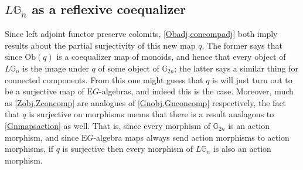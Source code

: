\subsection{$L\mathbb{G}_n$ as a reflexive coequalizer}

Since left adjoint functor preserve colomits, \cref{Obadj,concompadj} both imply results about the partial surjectivity of this new map $q$. The former says that since $\mathrm{Ob}(q)$ is a coequalizer map of monoids, and hence that every object of $L\mathbb{G}_n$ is the image under $q$ of some object of $\mathbb{G}_{2n}$; the latter says a similar thing for connected components. From this one might guess that $q$ is will just turn out to be a surjective map of $\mathrm{E}G$-algebras, and indeed this is the case. Moreover, much as \cref{Zobj,Zconcomp} are analogues of \cref{Gnobj,Gnconcomp} respectively, the fact that $q$ is surjective on morphisms means that there is a result analagous to \cref{Gnmapsaction} as well. That is, since every morphism of $\mathbb{G}_{2n}$ is an action morphism, and since $\mathrm{E}G$-algebra maps always send action morphisms to action morphisms, if $q$ is surjective then every morphism of $L\mathbb{G}_n$ is also an action morphism. 

